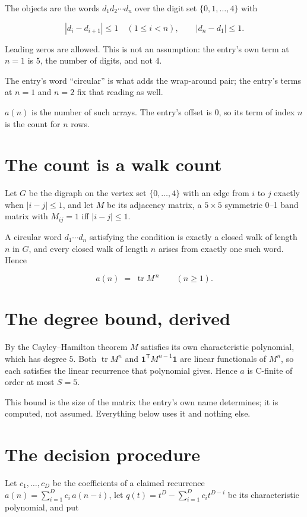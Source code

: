 \documentclass[11pt]{article}
\theoremstyle{definition}
\begin{document}
The objects are the words $d_1 d_2 \cdots d_n$ over the digit set $\{0,1,\dots,4\}$ with

\[|d_i - d_{i+1}| \le 1\quad (1 \le i < n), \qquad |d_n - d_1| \le 1.\]

Leading zeros are allowed. This is not an assumption: the entry's own term at $n=1$ is $5$, the number of digits, and not $4$.

The entry's word ``circular'' is what adds the wrap-around pair; the entry's terms at $n = 1$ and $n = 2$ fix that reading as well.

$a(n)$ is the number of such arrays. The entry's offset is 0, so its term of index $n$ is the count for $n$ rows.

\section{The count is a walk count}

Let $G$ be the digraph on the vertex set $\{0,\dots,4\}$ with an edge from $i$ to $j$ exactly when $|i-j| \le 1$, and let $M$ be its adjacency matrix, a $5 \times 5$ symmetric 0--1 band matrix with $M_{ij} = 1$ iff $|i-j| \le 1$.

A circular word $d_1\cdots d_n$ satisfying the condition is exactly a closed walk of length $n$ in $G$, and every closed walk of length $n$ arises from exactly one such word. Hence

\[a(n) \;=\; \operatorname{tr} M^{\,n} \qquad (n \ge 1).\]

\section{The degree bound, derived}

By the Cayley--Hamilton theorem $M$ satisfies its own characteristic polynomial, which has degree $5$. Both $\operatorname{tr} M^n$ and $\mathbf 1^{\mathsf T} M^{n-1} \mathbf 1$ are linear functionals of $M^{n}$, so each satisfies the linear recurrence that polynomial gives. Hence $a$ is C-finite of order at most $S = 5$.

This bound is the size of the matrix the entry's own name determines; it is computed, not assumed. Everything below uses it and nothing else.

\section{The decision procedure}

Let $c_1,\dots,c_D$ be the coefficients of a claimed recurrence $a(n) = \sum_{i=1}^{D} c_i\,a(n-i)$, let $q(t) = t^{D} - \sum_{i=1}^{D} c_i t^{D-i}$ be its characteristic polynomial, and put
\end{document}
